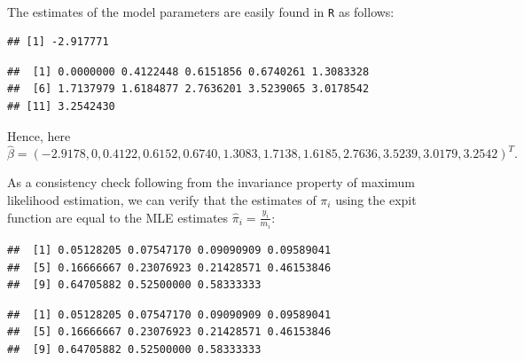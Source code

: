 \begin{solution}{5.9}
\begin{enumerate}
\begin{align*}
\end{align*}
The estimates of the model parameters are easily found in \texttt{R} as follows:
\begin{knitrout}
\color{fgcolor}\begin{kframe}
\begin{alltt}
 \hlkwb{<-} \hlstd{(y[}\hlstd{]}\hlopt{/}\hlstd{(m[}\hlstd{]}\hlopt{-}\hlstd{y[}\hlstd{])))}
\end{alltt}
\begin{verbatim}
## [1] -2.917771
\end{verbatim}
\begin{alltt}
 \hlkwb{<-} \hlstd{(}\hlstd{,}\hlstd{(y[}\hlopt{-}\hlstd{]}\hlopt{/}\hlstd{(m[}\hlopt{-}\hlstd{]}\hlopt{-}\hlstd{y[}\hlopt{-}\hlstd{]))}\hlopt{-}
\end{alltt}
\begin{verbatim}
##  [1] 0.0000000 0.4122448 0.6151856 0.6740261 1.3083328
##  [6] 1.7137979 1.6184877 2.7636201 3.5239065 3.0178542
## [11] 3.2542430
\end{verbatim}
\end{kframe}
\end{knitrout}
Hence, here $$\hat{\beta}=(-2.9178, 0, 0.4122, 0.6152, 0.6740, 1.3083, 1.7138, 1.6185, 2.7636, 3.5239, 3.0179, 3.2542)^{T}.$$

As a consistency check following from the invariance property of maximum likelihood estimation, we can verify that the estimates of $\pi_{i}$ using the expit function are equal to the MLE estimates $\hat{\pi}_{i}=\frac{y_{i}}{m_{i}}$:
\begin{knitrout}
\color{fgcolor}\begin{kframe}
\begin{alltt}
 \hlkwb{<-} \hlopt{+}\hlopt{/}\hlstd{(}\hlopt{+}\hlopt{+}
\end{alltt}
\begin{verbatim}
##  [1] 0.05128205 0.07547170 0.09090909 0.09589041
##  [5] 0.16666667 0.23076923 0.21428571 0.46153846
##  [9] 0.64705882 0.52500000 0.58333333
\end{verbatim}
\begin{alltt}
\hlopt{/}
\end{alltt}
\begin{verbatim}
##  [1] 0.05128205 0.07547170 0.09090909 0.09589041
##  [5] 0.16666667 0.23076923 0.21428571 0.46153846
##  [9] 0.64705882 0.52500000 0.58333333
\end{verbatim}
\end{kframe}
\end{knitrout}


\end{enumerate}
\end{solution}
